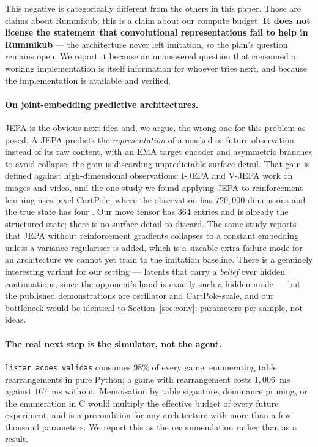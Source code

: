 \documentclass[11pt]{article}
\begin{document}
This negative is categorically different from the others in this paper. Those are claims about Rummikub; this is a claim about our compute budget. \textbf{It does not license the statement that convolutional representations fail to help in Rummikub} --- the architecture never left imitation, so the plan's question remains open. We report it because an unanswered question that consumed a working implementation is itself information for whoever tries next, and because the implementation is available and verified.

\paragraph{On joint-embedding predictive architectures.} JEPA \cite{assran2023} is the obvious next idea and, we argue, the wrong one for this problem as posed. A JEPA predicts the \emph{representation} of a masked or future observation instead of its raw content, with an EMA target encoder and asymmetric branches to avoid collapse; the gain is discarding unpredictable surface detail. That gain is defined against high-dimensional observations: I-JEPA and V-JEPA work on images and video, and the one study we found applying JEPA to reinforcement learning uses pixel CartPole, where the observation has $720{,}000$ dimensions and the true state has four \cite{zhang2025jeparl}. Our move tensor has $364$ entries and is already the structured state; there is no surface detail to discard. The same study reports that JEPA without reinforcement gradients collapses to a constant embedding unless a variance regulariser is added, which is a sizeable extra failure mode for an architecture we cannot yet train to the imitation baseline. There is a genuinely interesting variant for our setting --- latents that carry a \emph{belief} over hidden continuations, since the opponent's hand is exactly such a hidden mode \cite{uwmjepa2026} --- but the published demonstrations are oscillator and CartPole-scale, and our bottleneck would be identical to Section~\ref{sec:conv}: parameters per sample, not ideas.

\paragraph{The real next step is the simulator, not the agent.} \texttt{listar\_acoes\_validas} consumes $98\%$ of every game, enumerating table rearrangements in pure Python; a game with rearrangement costs $1{,}006$~ms against $167$~ms without. Memoisation by table signature, dominance pruning, or the enumeration in C would multiply the effective budget of every future experiment, and is a precondition for any architecture with more than a few thousand parameters. We report this as the recommendation rather than as a result.
\end{document}
